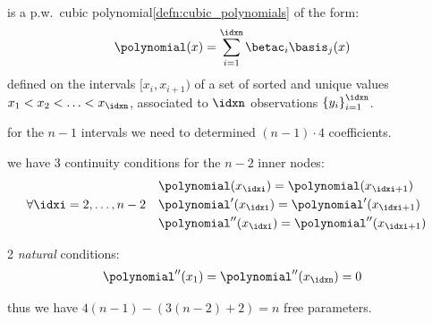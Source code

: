 \begin{defnbox}\nospacing
    \begin{defn}\label{defn:splines}\leavevmode\\
        \begin{minipage}[b]{0.58\textwidth}
            is a p.w.\ cubic polynomial\cref{defn:cubic_polynomials} of the form:
            \begin{align}
              \polynomial(x)=\sum_{i=1}^{\idxn}\betac_{i}\basis_{j}(x)
              \label{eq:splines}
            \end{align}
            defined on the intervals $[x_{i},x_{i+1})$ of a
            set of sorted and unique values $x_{1}<x_{2}<\ldots<x_{\idxn}$, associated to $\idxn$ observations $\left\{y_{i}\right\}_{i=1}^{\idxn}$.
        \end{minipage}\hfil
        \begin{minipage}[c]{0.4\textwidth}
        \centering{
          \resizebox{\linewidth}{!}{}
        }
        \end{minipage}
        \begin{itemizenosep}
            \item for the $n-1$ intervals we need to determined $(n-1)\cdot 4$ coefficients.
            \item we have 3 continuity conditions for the $n-2$ inner nodes:
            \begin{align}
              &\forall\idxi=2,\ldots,n-2&&
              \begin{aligned}
                  &\polynomial(x_{\idxi})=\polynomial(x_{\idxi+1})\\
                  &\polynomial'(x_{\idxi})=\polynomial'(x_{\idxi+1})\\
                  &\polynomial''(x_{\idxi})=\polynomial''(x_{\idxi+1})
              \end{aligned}
            \end{align}
            \item 2 \textit{natural} conditions:
            \begin{align}
              \polynomial''(x_{1})=\polynomial''(x_{\idxn})=0
            \end{align}
        \end{itemizenosep}
        thus we have $4(n-1)-\left(3(n-2)+2\right)=n$ free parameters.
    \end{defn}
\end{defnbox}

